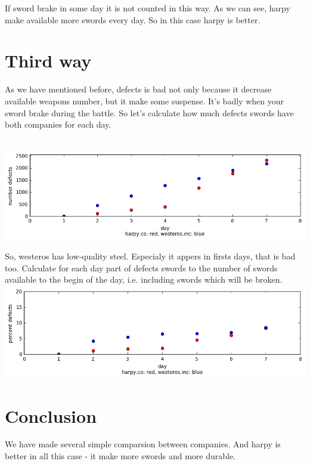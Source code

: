 \documentclass{article}
\begin{document}
	If sword brake in some day it is not counted in this way.
	As we can see, harpy make available more swords every day. So in this case harpy is better.
	
	
	\section{Third way}
	
	As we have mentioned before, defects is bad not only because it decrease available weapons number, but it make some suspense. It's badly when your sword brake during the battle. So let's calculate how much defects swords have both companies for each day.
	
   \hbox{\hspace{-5em} \includegraphics[scale=0.7]{daily_defects}}
		
	So, westeros has low-quality steel. Especialy it appers in firsts days, that is bad too.
	Calculate for each day part of defects swords to the number of swords available to the begin of the day, i.e. including swords which will be broken.
	\hbox{\hspace{-5em} \includegraphics[scale=0.7]{daily_defects_percent}}
			
	\section{Conclusion}	
	We have made several simple comparsion between companies. And harpy is better in all this case - it make more swords and more durable.
	
	
\end{document}
